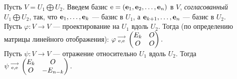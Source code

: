 Пусть $V = U_1 \bigoplus U_2$. 
Введем базис  $\mathrm{e} = (\mathbf{e}_1, \mathbf{e}_2, \ldots , \mathbf{e}_n)$ в $V$, {\it согласованный}  $U_1 \bigoplus U_2$, 
так, что $\mathbf{e}_1, \ldots , \mathbf{e}_k$ --- базис в $U_1$, а $\mathbf{e}_{k+1}, \ldots , \mathbf{e}_n$ --- базис в $U_2$.\\
Пусть  $\varphi: V\to V$ --- проектирование на $U_1$ вдоль $U_2$. 
Тогда (по определению матрицы линейного отображения): $\varphi \begin{smallmatrix} \longrightarrow \\ \mathrm{e}, \mathrm{e} \end{smallmatrix} \begin{pmatrix}
E_k & O \\
O & O
\end{pmatrix}.$\\
Пусть  $\psi: V\to V$ --- отражение относительно $U_1$ вдоль $U_2$. 
Тогда $\psi \begin{smallmatrix} \longrightarrow \\ \mathrm{e}, \mathrm{e} \end{smallmatrix} \begin{pmatrix}
E_k & O \\
O & -E_{n-k}
\end{pmatrix}.$






